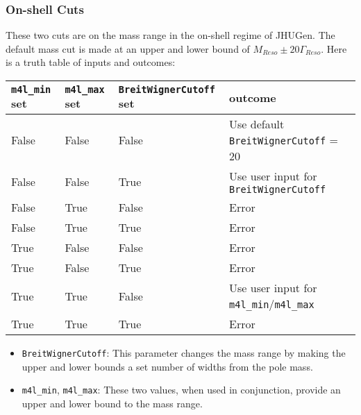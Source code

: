 \documentclass[aps,superscriptaddress,nofootinbib]{revtex4}
\begin{document}
\subsubsection{On-shell Cuts}
These two cuts are on the mass range in the on-shell regime of JHUGen. The default mass cut is made at an upper and lower bound of $M_{Reso}\pm20\Gamma_{Reso}$. Here is a truth table of inputs and outcomes:
\begin{table}[!ht]
  \centering
  \begin{tabular}{|l|l|l|l|l|}
  \hline
      \verb|m4l_min| set & \verb|m4l_max| set & \verb|BreitWignerCutoff| set & outcome\\ \hline
      False & False & False & Use default \verb|BreitWignerCutoff| = 20 \\ \hline
      False & False & True & Use user input for \verb|BreitWignerCutoff|\\ \hline
      False & True & False & Error \\ \hline
      False & True & True & Error \\ \hline
      True & False & False & Error \\ \hline
      True & False & True & Error \\ \hline
      True & True & False & Use user input for \verb|m4l_min|/\verb|m4l_max| \\ \hline
      True & True & True & Error \\ \hline
  \end{tabular}
\end{table}
\begin{itemize}
\item \verb|BreitWignerCutoff|: This parameter changes the mass range by making the upper and lower bounds a set number of widths from the pole mass.
\item \verb|m4l_min|, \verb|m4l_max|: These two values, when used in conjunction, provide an upper and lower bound to the mass range.
\end{itemize}
\end{document}
